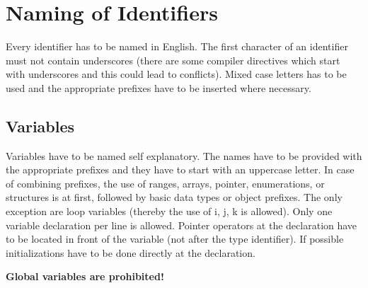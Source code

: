 \documentclass[final,a4paper,10pt, oneside]{article}
\begin{document}
\section{Naming of Identifiers}
Every identifier has to be named in English. The first character of an identifier must not contain underscores (there are some compiler directives which start with underscores and this could lead to conflicts). Mixed case letters has to be used and the appropriate prefixes have to be inserted where necessary.


\subsection{Variables}
Variables have to be named self explanatory. The names have to be provided with the appropriate prefixes and they have to start with an uppercase letter. In case of combining prefixes, the use of ranges, arrays, pointer, enumerations, or structures is at first, followed by basic data types or object prefixes. The only exception are loop variables (thereby the use of i, j, k is allowed). Only one variable declaration per line is allowed. Pointer operators at the declaration have to be located in front of the variable (not after the type identifier). If possible initializations have to be done directly at the declaration.

\textbf{Global variables are prohibited!}
\end{document}
